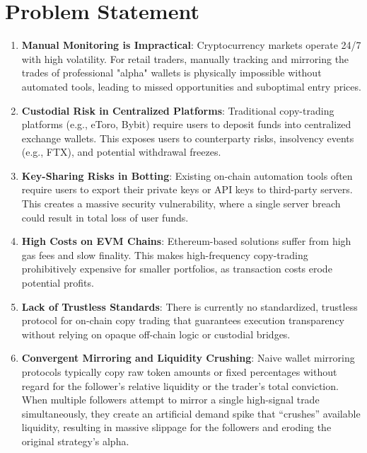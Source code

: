 \section{Problem Statement}

\begin{enumerate}
  \item \textbf{Manual Monitoring is Impractical}: Cryptocurrency markets operate 24/7 with high volatility. For retail traders, manually tracking and mirroring the trades of professional "alpha" wallets is physically impossible without automated tools, leading to missed opportunities and suboptimal entry prices.
  \item \textbf{Custodial Risk in Centralized Platforms}: Traditional copy-trading platforms (e.g., eToro, Bybit) require users to deposit funds into centralized exchange wallets. This exposes users to counterparty risks, insolvency events (e.g., FTX), and potential withdrawal freezes.
  \item \textbf{Key-Sharing Risks in Botting}: Existing on-chain automation tools often require users to export their private keys or API keys to third-party servers. This creates a massive security vulnerability, where a single server breach could result in total loss of user funds.
  \item \textbf{High Costs on EVM Chains}: Ethereum-based solutions suffer from high gas fees and slow finality. This makes high-frequency copy-trading prohibitively expensive for smaller portfolios, as transaction costs erode potential profits.
  \item \textbf{Lack of Trustless Standards}: There is currently no standardized, trustless protocol for on-chain copy trading that guarantees execution transparency without relying on opaque off-chain logic or custodial bridges.
  \item \textbf{Convergent Mirroring and Liquidity Crushing}: Naive wallet mirroring protocols typically copy raw token amounts or fixed percentages without regard for the follower's relative liquidity or the trader's total conviction. When multiple followers attempt to mirror a single high-signal trade simultaneously, they create an artificial demand spike that ``crushes'' available liquidity, resulting in massive slippage for the followers and eroding the original strategy's alpha.
\end{enumerate}
